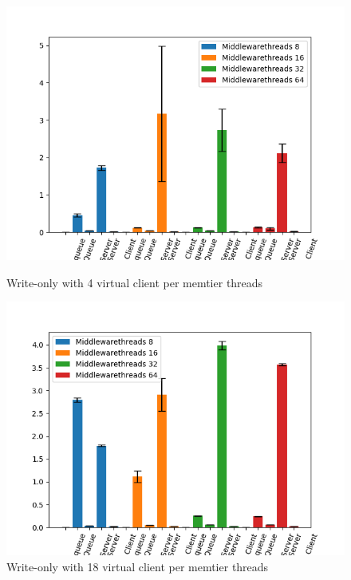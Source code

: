 \documentclass[11pt,a4paper]{article}
\begin{document}
\begin{figure}[H]
\begin{minipage}[b]{0.5\linewidth}
    \centering
    \includegraphics[width=0.9\linewidth]{img/exp4_1/exp4_1_mw_percentile_plots_writes_1__vc_4.png} 
    \caption{Write-only with 4 virtual client per memtier threads} 
    \vspace{4ex}
  \end{minipage}%
  \begin{minipage}[b]{0.5\linewidth}
    \centering
    \includegraphics[width=0.9\linewidth]{img/exp4_1/exp4_1_mw_percentile_plots_writes_1__vc_8.png} 
    \caption{Write-only with 18 virtual client per memtier threads} 
    \vspace{4ex}
  \end{minipage} 
    \begin{minipage}[b]{0.5\linewidth}
    \centering

\end{minipage}
\end{figure}
\end{document}
